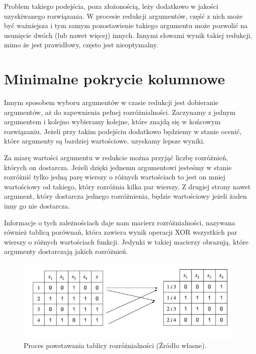 Problem takiego podejścia,
poza złożonością,
leży dodatkowo w jakości uzyskiwanego rozwiązania.
W procesie redukcji argumentów,
część z nich może być ważniejsza i tym samym pozostawienie takiego argumentu może pozwolić na usunięcie dwóch (lub nawet więcej) innych.
Innymi słowami wynik takiej redukcji,
mimo że jest prawidłowy,
często jest nieoptymalny.

\section{Minimalne pokrycie kolumnowe}

Innym sposobem wyboru argumentów w czasie redukcji jest dobieranie argumentów,
aż do zapewnienia pełnej rozróżnialności.
Zaczynamy z jednym argumentem i kolejno wybieramy kolejne,
które znajdą się w końcowym rozwiązaniu.
Jeżeli przy takim podejściu dodatkowo będziemy w stanie ocenić,
które argumenty są bardziej wartościowe,
uzyskamy lepsze wyniki.

Za miarę wartości argumentu w redukcie można przyjąć liczbę rozróżnień,
których on dostarcza.
Jeżeli dzięki jednemu argumentowi jesteśmy w stanie rozróżnić tylko jedną parę wierszy o różnych wartościach to jest on mniej wartościowy od takiego,
który rozróżnia kilka par wierszy.
Z drugiej strony nawet argument,
który dostarcza jednego rozróżnienia,
będzie wartościowy jeżeli żaden inny go nie dostarcza.

Informacje o tych zależnościach daje nam macierz rozróżnialności, nazywana również tablicą porównań,
która zawiera wynik operacji XOR wszystkich par wierszy o różnych wartościach funkcji.
Jedynki w takiej macierzy obrazują,
które argumenty dostarczają jakich rozróżnień.

\begin{figure}[H]
\centering
\includegraphics[width = 13cm]{chapter03/discernibility-table.jpg}
\caption{Proces powstawania tablicy rozróżnialności (Źródło własne).}
\end{figure}


